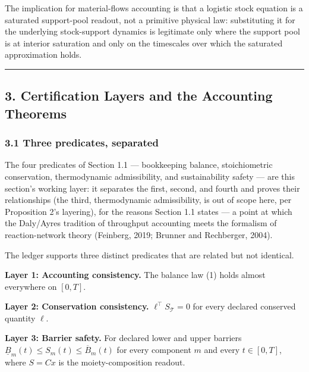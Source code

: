 \documentclass[11pt]{article}
\begin{document}
The implication for material-flows accounting is that a logistic stock
equation is a saturated support-pool readout, not a primitive physical
law: substituting it for the underlying stock-support dynamics is
legitimate only where the support pool is at interior saturation and
only on the timescales over which the saturated approximation holds.

\begin{center}\rule{0.5\linewidth}{0.5pt}\end{center}

\subsection{3. Certification Layers and the Accounting
Theorems}\label{certification-layers-and-the-accounting-theorems}

\subsubsection{3.1 Three predicates,
separated}\label{three-predicates-separated}

The four predicates of Section 1.1 --- bookkeeping balance,
stoichiometric conservation, thermodynamic admissibility, and
sustainability safety --- are this section's working layer: it separates
the first, second, and fourth and proves their relationships (the third,
thermodynamic admissibility, is out of scope here, per Proposition 2's
layering), for the reasons Section 1.1 states --- a point at which the
Daly/Ayres tradition of throughput accounting meets the formalism of
reaction-network theory (Feinberg, 2019; Brunner and Rechberger, 2004).

The ledger supports three distinct predicates that are related but not
identical.

\textbf{Layer 1: Accounting consistency.} The balance law (1) holds
almost everywhere on \([0,T]\).

\textbf{Layer 2: Conservation consistency.}
\(\ell^\top S_{\mathcal{T}} = 0\) for every declared conserved quantity
\(\ell\).

\textbf{Layer 3: Barrier safety.} For declared lower and upper barriers
\(\underline{B}_m(t) \le S_m(t) \le \overline{B}_m(t)\) for every
component \(m\) and every \(t \in [0,T]\), where \(S = Cx\) is the
moiety-composition readout.
\end{document}
